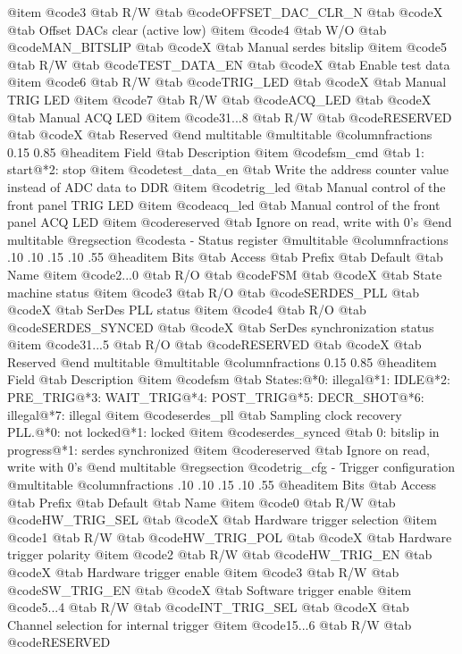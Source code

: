 @item @code{3}
@tab R/W @tab
@code{OFFSET_DAC_CLR_N}
@tab @code{X} @tab 
Offset DACs clear (active low)
@item @code{4}
@tab W/O @tab
@code{MAN_BITSLIP}
@tab @code{X} @tab 
Manual serdes bitslip
@item @code{5}
@tab R/W @tab
@code{TEST_DATA_EN}
@tab @code{X} @tab 
Enable test data
@item @code{6}
@tab R/W @tab
@code{TRIG_LED}
@tab @code{X} @tab 
Manual TRIG LED
@item @code{7}
@tab R/W @tab
@code{ACQ_LED}
@tab @code{X} @tab 
Manual ACQ LED
@item @code{31...8}
@tab R/W @tab
@code{RESERVED}
@tab @code{X} @tab 
Reserved
@end multitable
@multitable @columnfractions 0.15 0.85
@headitem Field @tab Description
@item @code{fsm_cmd} @tab 1: start@*2: stop
@item @code{test_data_en} @tab Write the address counter value instead of ADC data to DDR
@item @code{trig_led} @tab Manual control of the front panel TRIG LED
@item @code{acq_led} @tab Manual control of the front panel ACQ LED
@item @code{reserved} @tab Ignore on read, write with 0's
@end multitable
@regsection @code{sta} - Status register
@multitable @columnfractions .10 .10 .15 .10 .55
@headitem Bits @tab Access @tab Prefix @tab Default @tab Name
@item @code{2...0}
@tab R/O @tab
@code{FSM}
@tab @code{X} @tab 
State machine status
@item @code{3}
@tab R/O @tab
@code{SERDES_PLL}
@tab @code{X} @tab 
SerDes PLL status
@item @code{4}
@tab R/O @tab
@code{SERDES_SYNCED}
@tab @code{X} @tab 
SerDes synchronization status
@item @code{31...5}
@tab R/O @tab
@code{RESERVED}
@tab @code{X} @tab 
Reserved
@end multitable
@multitable @columnfractions 0.15 0.85
@headitem Field @tab Description
@item @code{fsm} @tab States:@*0: illegal@*1: IDLE@*2: PRE_TRIG@*3: WAIT_TRIG@*4: POST_TRIG@*5: DECR_SHOT@*6: illegal@*7: illegal
@item @code{serdes_pll} @tab Sampling clock recovery PLL.@*0: not locked@*1: locked
@item @code{serdes_synced} @tab 0: bitslip in progress@*1: serdes synchronized
@item @code{reserved} @tab Ignore on read, write with 0's
@end multitable
@regsection @code{trig_cfg} - Trigger configuration
@multitable @columnfractions .10 .10 .15 .10 .55
@headitem Bits @tab Access @tab Prefix @tab Default @tab Name
@item @code{0}
@tab R/W @tab
@code{HW_TRIG_SEL}
@tab @code{X} @tab 
Hardware trigger selection
@item @code{1}
@tab R/W @tab
@code{HW_TRIG_POL}
@tab @code{X} @tab 
Hardware trigger polarity
@item @code{2}
@tab R/W @tab
@code{HW_TRIG_EN}
@tab @code{X} @tab 
Hardware trigger enable
@item @code{3}
@tab R/W @tab
@code{SW_TRIG_EN}
@tab @code{X} @tab 
Software trigger enable
@item @code{5...4}
@tab R/W @tab
@code{INT_TRIG_SEL}
@tab @code{X} @tab 
Channel selection for internal trigger
@item @code{15...6}
@tab R/W @tab
@code{RESERVED}
